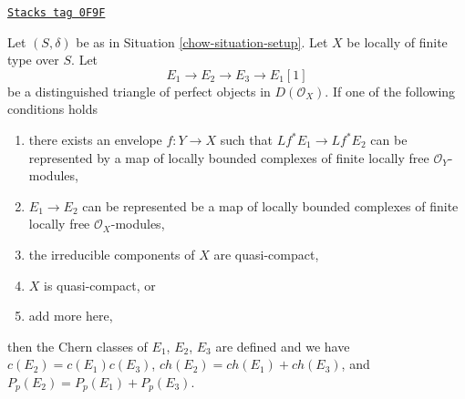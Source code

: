 \begin{lemma}
\label{chow-lemma-additivity-on-perfect}
\href{https://stacks.math.columbia.edu/tag/0F9F}{\texttt{Stacks tag 0F9F}}

Let $(S, \delta)$ be as in Situation \ref{chow-situation-setup}.
Let $X$ be locally of finite type over $S$. Let
$$
E_1 \to E_2 \to E_3 \to E_1[1]
$$
be a distinguished triangle of perfect objects in $D(\mathcal{O}_X)$.
If one of the following conditions holds
\begin{enumerate}
\item there exists an envelope $f : Y \to X$ such that
$Lf^*E_1 \to Lf^*E_2$ can be represented by a map of locally
bounded complexes of finite locally free $\mathcal{O}_Y$-modules,
\item $E_1 \to E_2$ can be represented be a map of locally bounded complexes
of finite locally free $\mathcal{O}_X$-modules,
\item the irreducible components of $X$ are quasi-compact,
\item $X$ is quasi-compact, or
\item add more here,
\end{enumerate}
then the Chern classes of $E_1$, $E_2$, $E_3$ are defined and we have
$c(E_2) = c(E_1) c(E_3)$, $ch(E_2) = ch(E_1) + ch(E_3)$, and
$P_p(E_2) = P_p(E_1) + P_p(E_3)$.
\end{lemma}

